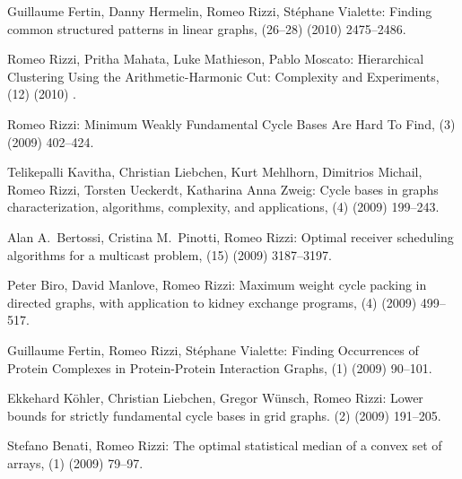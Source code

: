 \begin{etaremune}
  \item {\sc Guillaume Fertin, Danny Hermelin, Romeo Rizzi, St\'ephane Vialette:}
   \newblock  Finding common structured patterns in linear graphs,
   (26--28) (2010) 2475--2486.

  \item {\sc Romeo Rizzi, Pritha Mahata, Luke Mathieson, Pablo Moscato:}
   \newblock  Hierarchical Clustering Using the Arithmetic-Harmonic Cut: Complexity and Experiments,
   (12) (2010) .

  \item {\sc Romeo Rizzi:}
   \newblock   Minimum Weakly Fundamental Cycle Bases Are Hard To Find,
   (3) (2009) 402--424.

  \item {\sc Telikepalli Kavitha, Christian Liebchen, Kurt Mehlhorn, Dimitrios Michail, Romeo Rizzi, Torsten Ueckerdt, Katharina Anna Zweig:}
   \newblock  Cycle bases in graphs characterization, algorithms, complexity, and applications,
   (4) (2009) 199--243.

  \item {\sc Alan A.~Bertossi, Cristina M.~Pinotti, Romeo Rizzi:}
   \newblock  Optimal receiver scheduling algorithms for a multicast problem,
   (15) (2009) 3187--3197.

  \item {\sc Peter Biro, David Manlove, Romeo Rizzi:}
   \newblock   Maximum weight cycle packing in directed graphs, with application to kidney exchange programs,
   (4) (2009) 499--517.

  \item {\sc Guillaume Fertin, Romeo Rizzi, St\'ephane Vialette:}
   \newblock  Finding Occurrences of Protein
              Complexes in Protein-Protein Interaction Graphs,
   (1) (2009) 90--101.

  \item {\sc Ekkehard K\"ohler, Christian Liebchen, Gregor W\"unsch, Romeo Rizzi:}
   \newblock  Lower bounds for strictly fundamental cycle bases in grid graphs.    
   (2) (2009) 191--205.

  \item {\sc Stefano Benati, Romeo Rizzi:}
   \newblock   The optimal statistical median of a convex set of arrays,
   (1) (2009) 79--97.


\end{etaremune}
